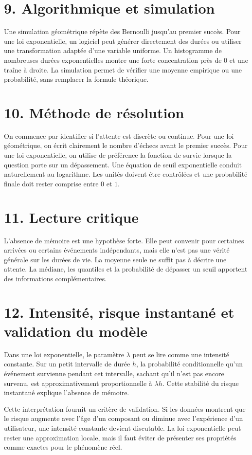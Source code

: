 \section{9. Algorithmique et simulation}
Une simulation géométrique répète des Bernoulli jusqu'au premier succès. Pour une loi exponentielle, un logiciel peut générer directement des durées ou utiliser une transformation adaptée d'une variable uniforme.
Un histogramme de nombreuses durées exponentielles montre une forte concentration près de $0$ et une traîne à droite. La simulation permet de vérifier une moyenne empirique ou une probabilité, sans remplacer la formule théorique.
\section{10. Méthode de résolution}
On commence par identifier si l'attente est discrète ou continue. Pour une loi géométrique, on écrit clairement le nombre d'échecs avant le premier succès. Pour une loi exponentielle, on utilise de préférence la fonction de survie lorsque la question porte sur un dépassement.
Une équation de seuil exponentielle conduit naturellement au logarithme. Les unités doivent être contrôlées et une probabilité finale doit rester comprise entre $0$ et $1$.
\section{11. Lecture critique}
L'absence de mémoire est une hypothèse forte. Elle peut convenir pour certaines arrivées ou certains événements indépendants, mais elle n'est pas une vérité générale sur les durées de vie.
La moyenne seule ne suffit pas à décrire une attente. La médiane, les quantiles et la probabilité de dépasser un seuil apportent des informations complémentaires.
\section{12. Intensité, risque instantané et validation du modèle}
Dans une loi exponentielle, le paramètre $\lambda$ peut se lire comme une intensité constante. Sur un petit intervalle de durée $h$, la probabilité conditionnelle qu'un événement survienne pendant cet intervalle, sachant qu'il n'est pas encore survenu, est approximativement proportionnelle à $\lambda h$. Cette stabilité du risque instantané explique l'absence de mémoire.

Cette interprétation fournit un critère de validation. Si les données montrent que le risque augmente avec l'âge d'un composant ou diminue avec l'expérience d'un utilisateur, une intensité constante devient discutable. La loi exponentielle peut rester une approximation locale, mais il faut éviter de présenter ses propriétés comme exactes pour le phénomène réel.

